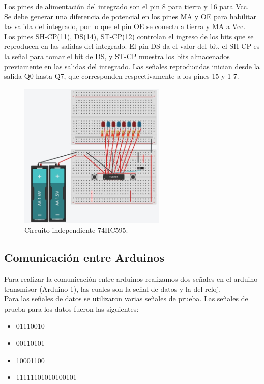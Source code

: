 \documentclass{article}
\begin{document}
Los pines de alimentación del integrado son el pin 8 para tierra y 16 para Vcc.\\

Se debe generar una diferencia de potencial en los pines MA y OE para habilitar las salida del integrado, por lo que el pin OE se conecta a tierra y MA a Vcc.\\

Los pines SH-CP(11), DS(14), ST-CP(12) controlan el ingreso de los bits que se reproducen en las salidas del integrado. El pin DS da el valor del bit, el SH-CP es la señal para tomar el bit de DS, y ST-CP muestra los bits almacenados previamente en las salidas del integrado. Las señales reproducidas inician desde la salida Q0 hasta Q7, que corresponden respectivamente a los pines 15 y 1-7.\\


\begin{figure}[h]
\includegraphics[width=7cm]{74HC595.jpg}
\centering
\caption{Circuito independiente 74HC595.}
\label{fig:74HC595.jpg}
\end{figure}




\subsection{Comunicación entre Arduinos}
Para realizar la comunicación entre arduinos realizamos dos señales en el arduino transmisor (Arduino 1), las cuales son la señal de datos y la del reloj. \\

Para las señales de datos se utilizaron varias señales de prueba. Las señales de prueba para los datos fueron las siguientes:
\begin{itemize}
\item 01110010
\item 00110101
\item 10001100
\item 11111101010100101
\end{itemize}
\end{document}
